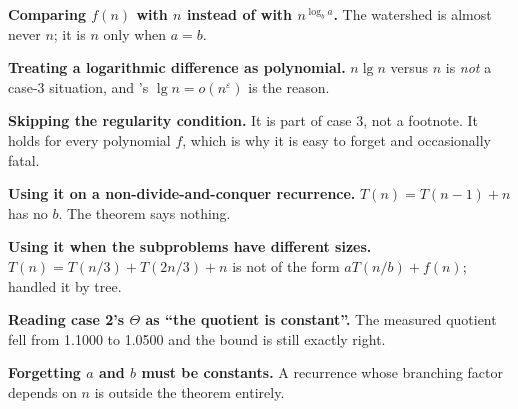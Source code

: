 \begin{pitfall}
\begin{tight}
  \item \textbf{Comparing $f(n)$ with $n$ instead of with $n^{\log_{b}a}$.}
        The watershed is almost never $n$; it is $n$ only when $a = b$.
  \item \textbf{Treating a logarithmic difference as polynomial.}
        $n\lg n$ versus $n$ is \emph{not} a case-3 situation, and
        's $\lg n = o(n^{\varepsilon})$ is the reason.
  \item \textbf{Skipping the regularity condition.} It is part of case 3, not
        a footnote. It holds for every polynomial $f$, which is why it is easy
        to forget and occasionally fatal.
  \item \textbf{Using it on a non-divide-and-conquer recurrence.}
        $T(n) = T(n-1) + n$ has no $b$. The theorem says nothing.
  \item \textbf{Using it when the subproblems have different sizes.}
        $T(n) = T(n/3) + T(2n/3) + n$ is not of the form $aT(n/b) + f(n)$;
         handled it by tree.
  \item \textbf{Reading case 2's $\Theta$ as ``the quotient is constant''.}
        The measured quotient fell from 1.1000 to 1.0500 and the bound is still
        exactly right.
  \item \textbf{Forgetting $a$ and $b$ must be constants.} A recurrence whose
        branching factor depends on $n$ is outside the theorem entirely.
\end{tight}
\end{pitfall}

